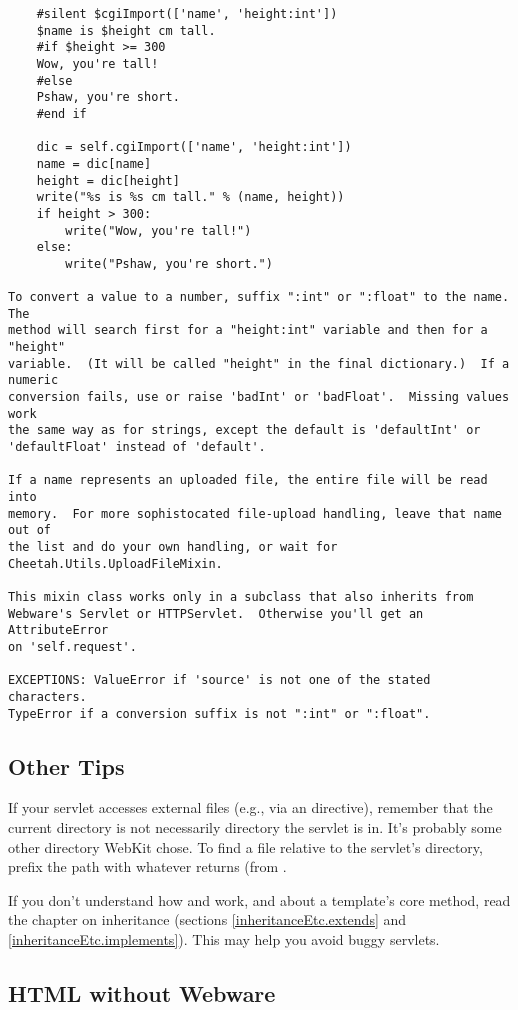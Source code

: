 \begin{verbatim}
    #silent $cgiImport(['name', 'height:int'])
    $name is $height cm tall.
    #if $height >= 300
    Wow, you're tall!
    #else
    Pshaw, you're short.
    #end if

    dic = self.cgiImport(['name', 'height:int'])
    name = dic[name]
    height = dic[height]
    write("%s is %s cm tall." % (name, height))
    if height > 300:
        write("Wow, you're tall!")
    else:
        write("Pshaw, you're short.")

To convert a value to a number, suffix ":int" or ":float" to the name.  The
method will search first for a "height:int" variable and then for a "height"
variable.  (It will be called "height" in the final dictionary.)  If a numeric
conversion fails, use or raise 'badInt' or 'badFloat'.  Missing values work
the same way as for strings, except the default is 'defaultInt' or
'defaultFloat' instead of 'default'.

If a name represents an uploaded file, the entire file will be read into 
memory.  For more sophistocated file-upload handling, leave that name out of
the list and do your own handling, or wait for Cheetah.Utils.UploadFileMixin.

This mixin class works only in a subclass that also inherits from 
Webware's Servlet or HTTPServlet.  Otherwise you'll get an AttributeError
on 'self.request'.

EXCEPTIONS: ValueError if 'source' is not one of the stated characters.
TypeError if a conversion suffix is not ":int" or ":float".
\end{verbatim}

\subsection{Other Tips}
\label{webware.otherTips}

If your servlet accesses external files (e.g., via an 
directive), remember that the current directory is not necessarily directory
the servlet is in.  It's probably some other directory WebKit chose.  To find a
file relative to the servlet's directory, prefix the path with whatever
 returns (from .

If you don't understand how  and  work, and
about a template's core method, read the chapter on inheritance (sections
\ref{inheritanceEtc.extends} and \ref{inheritanceEtc.implements}).  This may
help you avoid buggy servlets.

\subsection{HTML without Webware}
\label{webware.not}


